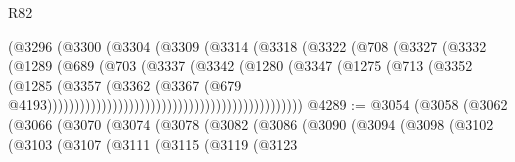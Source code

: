 \begin{lexlean}{R82}
\begin{coremodule}
                                                (@3296
                                                  (@3300
                                                    (@3304
                                                      (@3309
                                                        (@3314
                                                          (@3318
                                                            (@3322
                                                              (@708
                                                                (@3327
                                                                  (@3332
                                                                    (@1289
                                                                      (@689
                                                                        (@703
                                                                          (@3337
                                                                            (@3342
                                                                              (@1280
                                                                                (@3347
                                                                                  (@1275
                                                                                    (@713
                                                                                      (@3352
                                                                                        (@1285
                                                                                          (@3357
                                                                                            (@3362
                                                                                              (@3367
                                                                                                (@679
                                                                                                  @4193)))))))))))))))))))))))))))))))))))))))))))))))
@4289 := @3054
    (@3058
      (@3062
        (@3066
          (@3070
            (@3074
              (@3078
                (@3082
                  (@3086
                    (@3090
                      (@3094
                        (@3098
                          (@3102
                            (@3103
                              (@3107
                                (@3111
                                  (@3115
                                    (@3119
                                      (@3123

\end{coremodule}
\end{lexlean}
